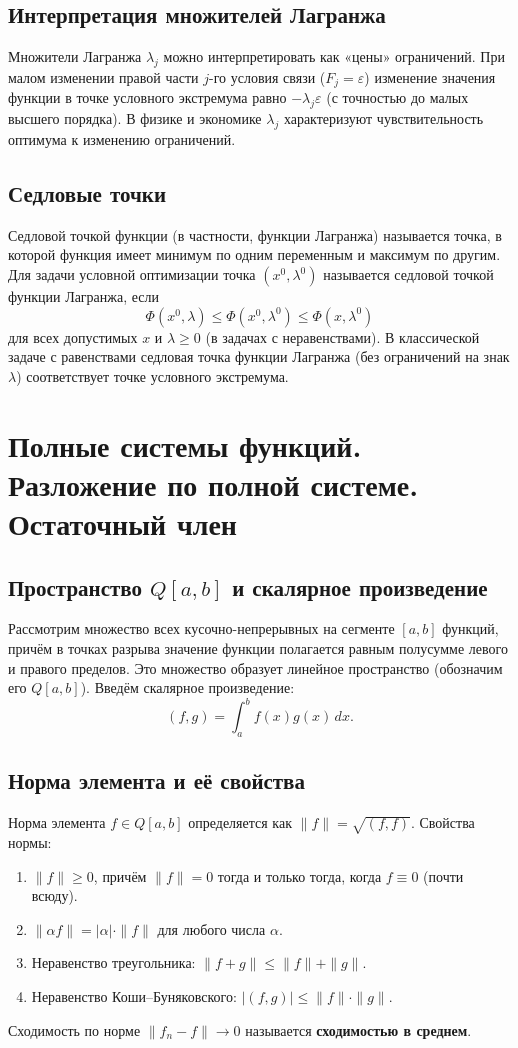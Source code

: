 \documentclass{article}
\theoremstyle{definition}
\begin{document}
\subsection{Интерпретация множителей Лагранжа}
Множители Лагранжа $\lambda_j$ можно интерпретировать как «цены» ограничений. При малом изменении правой части $j$-го условия связи ($F_j=\varepsilon$) изменение значения функции в точке условного экстремума равно $-\lambda_j\varepsilon$ (с точностью до малых высшего порядка). В физике и экономике $\lambda_j$ характеризуют чувствительность оптимума к изменению ограничений.

\subsection{Седловые точки}
Седловой точкой функции (в частности, функции Лагранжа) называется точка, в которой функция имеет минимум по одним переменным и максимум по другим. Для задачи условной оптимизации точка $(x^0,\lambda^0)$ называется седловой точкой функции Лагранжа, если
\[
\Phi(x^0,\lambda)\le\Phi(x^0,\lambda^0)\le\Phi(x,\lambda^0)
\]
для всех допустимых $x$ и $\lambda\ge0$ (в задачах с неравенствами). В классической задаче с равенствами седловая точка функции Лагранжа (без ограничений на знак $\lambda$) соответствует точке условного экстремума.

\section{Полные системы функций. Разложение по полной системе. Остаточный член}

\subsection{Пространство $Q[a,b]$ и скалярное произведение}
Рассмотрим множество всех кусочно-непрерывных на сегменте $[a,b]$ функций, причём в точках разрыва значение функции полагается равным полусумме левого и правого пределов. Это множество образует линейное пространство (обозначим его $Q[a,b]$). Введём скалярное произведение:
\[
(f,g)=\int_a^b f(x)g(x)\,dx.
\]

\subsection{Норма элемента и её свойства}
Норма элемента $f\in Q[a,b]$ определяется как $\|f\|=\sqrt{(f,f)}$. Свойства нормы:
\begin{enumerate}
    \item $\|f\|\ge0$, причём $\|f\|=0$ тогда и только тогда, когда $f\equiv0$ (почти всюду).
    \item $\|\alpha f\| = |\alpha|\cdot\|f\|$ для любого числа $\alpha$.
    \item Неравенство треугольника: $\|f+g\|\le\|f\|+\|g\|$.
    \item Неравенство Коши–Буняковского: $|(f,g)|\le\|f\|\cdot\|g\|$.
\end{enumerate}
Сходимость по норме $\|f_n-f\|\to0$ называется \textbf{сходимостью в среднем}.
\end{document}
